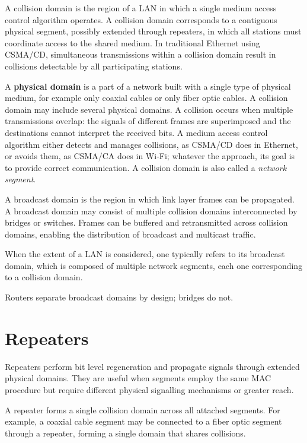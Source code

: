 A collision domain is the region of a LAN in which a single medium access control algorithm operates. A collision domain corresponds to a contiguous physical segment, possibly extended through repeaters, in which all stations must coordinate access to the shared medium. In traditional Ethernet using CSMA/CD, simultaneous transmissions within a collision domain result in collisions detectable by all participating stations.

A \textbf{physical domain} is a part of a network built with a single type of physical medium, for example only coaxial cables or only fiber optic cables. A collision domain may include several physical domains. A collision occurs when multiple transmissions overlap: the signals of different frames are superimposed and the destinations cannot interpret the received bits. A medium access control algorithm either detects and manages collisions, as CSMA/CD does in Ethernet, or avoids them, as CSMA/CA does in Wi-Fi; whatever the approach, its goal is to provide correct communication. A collision domain is also called a \textit{network segment}.

A broadcast domain is the region in which link layer frames can be propagated. A broadcast domain may consist of multiple collision domains interconnected by bridges or switches. Frames can be buffered and retransmitted across collision domains, enabling the distribution of broadcast and multicast traffic.

When the extent of a LAN is considered, one typically refers to its broadcast domain, which is composed of multiple network segments, each one corresponding to a collision domain.

Routers separate broadcast domains by design; bridges do not.

\section{Repeaters}

Repeaters perform bit level regeneration and propagate signals through extended physical domains. They are useful when segments employ the same MAC procedure but require different physical signalling mechanisms or greater reach.

A repeater forms a single collision domain across all attached segments. For example, a coaxial cable segment may be connected to a fiber optic segment through a repeater, forming a single domain that shares collisions.




